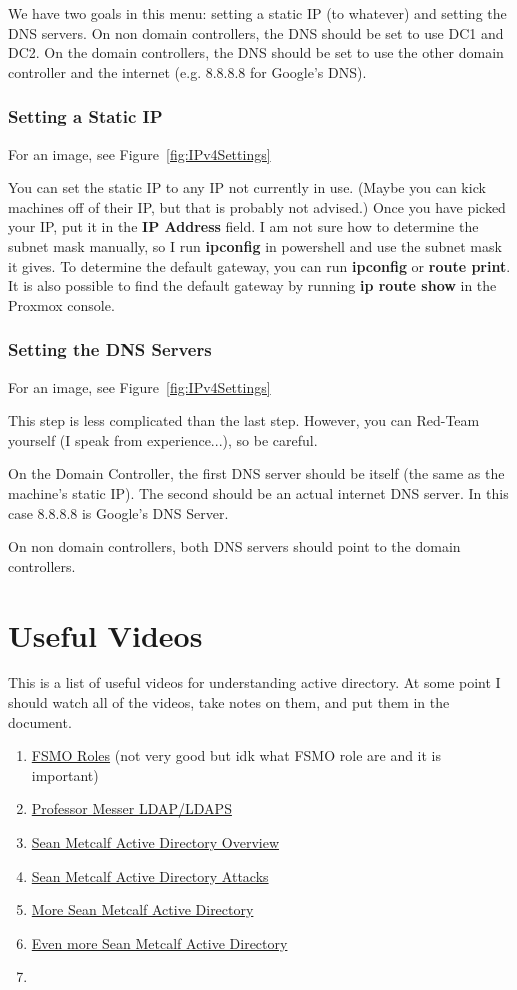 \documentclass{article}
\begin{document}
We have two goals in this menu: setting a static IP (to whatever) and setting the DNS servers. 
On non domain controllers, the DNS should be set to use DC1 and DC2.
On the domain controllers, the DNS should be set to use the other domain controller and the internet (e.g. 8.8.8.8 for Google's DNS).

\subsubsection{Setting a Static IP}
For an image, see Figure~\ref{fig:IPv4Settings}

You can set the static IP to any IP not currently in use.
(Maybe you can kick machines off of their IP, but that is probably not advised.)
Once you have picked your IP, put it in the \textbf{IP Address} field.
I am not sure how to determine the subnet mask manually, so I run \textbf{ipconfig} in powershell
and use the subnet mask it gives.
To determine the default gateway, you can run \textbf{ipconfig} or \textbf{route print}.
It is also possible to find the default gateway by running \textbf{ip route show} in the Proxmox console.


\subsubsection{Setting the DNS Servers}
For an image, see Figure~\ref{fig:IPv4Settings}

This step is less complicated than the last step. However, you can Red-Team yourself (I speak from experience...), so be careful.

On the Domain Controller, the first DNS server should be itself (the same as the machine's static IP). The second should be an actual internet DNS server.
In this case 8.8.8.8 is Google's DNS Server.

On non domain controllers, both DNS servers should point to the domain controllers.

\section{Useful Videos}
This is a list of useful videos for understanding active directory.
At some point I should watch all of the videos, take notes on them, and put them in the document.
\begin{enumerate}
        \item \href{https://youtu.be/n5suPvKqo_Y}{FSMO Roles} (not very good but idk what FSMO role are and it is important)
        \item \href{https://youtu.be/5rEA7vRV3VE}{Professor Messer LDAP/LDAPS}
        \item \href{https://youtu.be/2w1cesS7pGY}{Sean Metcalf Active Directory Overview}
        \item \href{https://youtu.be/ze1UcSLOypw}{Sean Metcalf Active Directory Attacks}
        \item \href{https://youtu.be/Lz6haohGAMc}{More Sean Metcalf Active Directory}
        \item\href{https://youtu.be/b6GUXerE9Ac}{Even more Sean Metcalf Active Directory}
        \item 
\end{enumerate}
\end{document}
